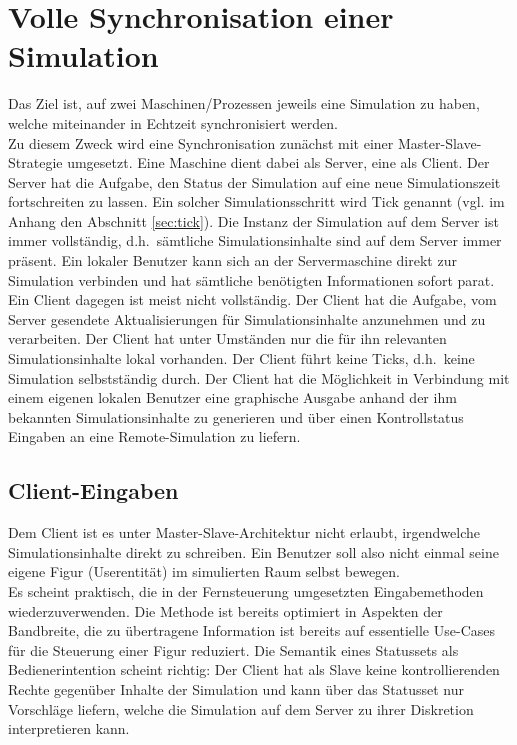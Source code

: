 \section{Volle Synchronisation einer Simulation}
Das Ziel ist, auf zwei Maschinen/Prozessen jeweils eine Simulation zu haben, welche miteinander in Echtzeit synchronisiert werden.\\
Zu diesem Zweck wird eine Synchronisation zunächst mit einer Master-Slave-Strategie umgesetzt. Eine Maschine dient dabei als Server, eine als Client.
Der Server hat die Aufgabe, den Status der Simulation auf eine neue Simulationszeit fortschreiten zu lassen. Ein solcher Simulationsschritt wird Tick genannt (vgl. im Anhang den Abschnitt \ref{sec:tick}). Die Instanz der Simulation auf dem Server ist immer vollständig, d.h.~sämtliche Simulationsinhalte sind auf dem Server immer präsent. Ein lokaler Benutzer kann sich an der Servermaschine direkt zur Simulation verbinden und hat sämtliche benötigten Informationen sofort parat.\\
Ein Client dagegen ist meist nicht vollständig. Der Client hat die Aufgabe, vom Server gesendete Aktualisierungen für Simulationsinhalte anzunehmen und zu verarbeiten. Der Client hat unter Umständen nur die für ihn relevanten Simulationsinhalte lokal vorhanden. Der Client führt keine Ticks, d.h.~keine Simulation selbstständig durch. Der Client hat die Möglichkeit in Verbindung mit einem eigenen lokalen Benutzer eine graphische Ausgabe anhand der ihm bekannten Simulationsinhalte zu generieren und über einen Kontrollstatus Eingaben an eine Remote-Simulation zu liefern. 

\subsection{Client-Eingaben}
Dem Client ist es unter Master-Slave-Architektur nicht erlaubt, irgendwelche Simulationsinhalte direkt zu schreiben. Ein Benutzer soll also nicht einmal seine eigene Figur (Userentität) im simulierten Raum selbst bewegen.\\
Es scheint praktisch, die in der Fernsteuerung umgesetzten Eingabemethoden wiederzuverwenden. Die Methode ist bereits optimiert in Aspekten der Bandbreite, die zu übertragene Information ist bereits auf essentielle Use-Cases für die Steuerung einer Figur reduziert. Die Semantik eines Statussets als Bedienerintention scheint richtig: Der Client hat als Slave keine kontrollierenden Rechte gegenüber Inhalte der Simulation und kann über das Statusset nur Vorschläge liefern, welche die Simulation auf dem Server zu ihrer Diskretion interpretieren kann.

